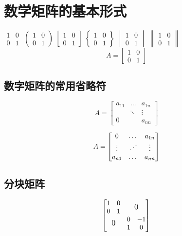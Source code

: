 \documentclass{article}
\newcommand{\adots}{\mathinner{\mkern2mu%
\raisebox{0.1em}{.}\mkern2mu\raisebox{0.4em}{.}%
\mkern2mu\raisebox{0.7em}{.}\mkern1mu}}
\begin{document}
	
	\section[数学矩阵的基本形式]{数学矩阵的基本形式}
	\(
	\begin{matrix}
		1 & 0 \\
		0 & 1 
	\end{matrix}
	\) \qquad
	\(
	\begin{pmatrix}
		1 & 0 \\
		0 & 1 
	\end{pmatrix}
	\) \qquad
	\(
	\begin{bmatrix}
		1 & 0 \\
		0 & 1 
	\end{bmatrix}
	\) \qquad
	\(
	\begin{Bmatrix}
		1 & 0 \\
		0 & 1 
	\end{Bmatrix}
	\) \qquad
	\(
	\begin{vmatrix}
		1 & 0 \\
		0 & 1 
	\end{vmatrix}
	\) \qquad
	\(
	\begin{Vmatrix}
		1 & 0 \\
		0 & 1 
	\end{Vmatrix}
	\) \\
	\[
	A=
	\begin{bmatrix}
		1 & 0 \\
		0 & 1 
	\end{bmatrix}
	\]
	
	\subsection{数字矩阵的常用省略符} %
	\[
	A=
	\begin{bmatrix}
		a_{11} & \dots & a_{1n} \\
		       & \ddots& \vdots \\
		0      &       & a_{nn}
	\end{bmatrix}
	\]	
	
	\[
	A=
	\begin{bmatrix}
			0  & \dots  & a_{1n}  \\
		 \vdots& \adots & \vdots  \\
		a_{n1} & \dots  & a_{nn}
	\end{bmatrix}
	\]
	\subsection{分块矩阵}
	\[
	\begin{bmatrix}

	\begin{matrix}	1 & 0 \\ 0 & 1 \end{matrix} 
	& \text{\large 0} \\
	\text{\large 0}  
	& \begin{matrix} 0 & -1 \\ 1 & 0\end{matrix}
	
    \end{bmatrix}
	\]
	
\end{document}
